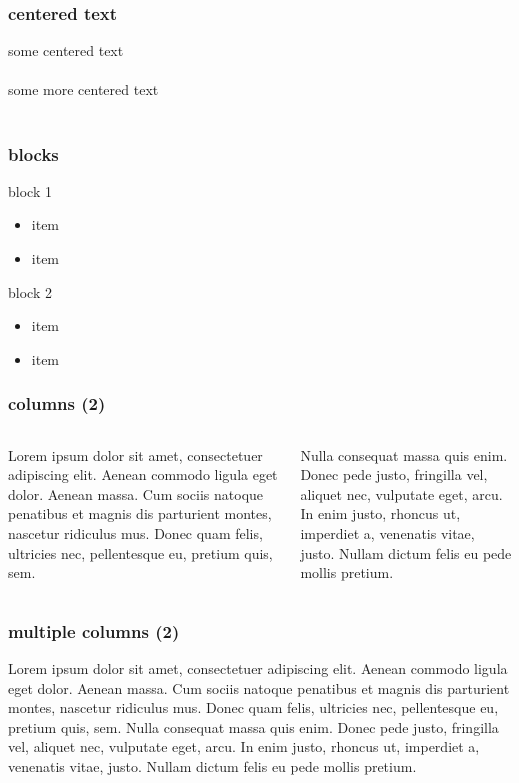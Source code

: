 \begin{frame}
\frametitle{centered text}
\begin{center}
some centered text\\\mbox{}\\some more centered text\\\mbox{}\\
\end{center}
\end{frame}

\begin{frame}
\frametitle{blocks}
\begin{block}{block 1}
\begin{itemize}
\item item
\item item
\end{itemize}
\end{block}
\begin{block}{block 2}
\begin{itemize}
\item item
\item item
\end{itemize}
\end{block}
\end{frame}

\begin{frame}
\frametitle{columns (2)}
\begin{columns}
\begin{column}[t]{.5\textwidth}
\justifying
Lorem ipsum dolor sit amet, consectetuer adipiscing elit. Aenean commodo ligula eget dolor. Aenean massa. Cum sociis natoque penatibus et magnis dis parturient montes, nascetur ridiculus mus. Donec quam felis, ultricies nec, pellentesque eu, pretium quis, sem.
\end{column}
\hfill
\begin{column}[t]{.5\textwidth}
\justifying
Nulla consequat massa quis enim. Donec pede justo, fringilla vel, aliquet nec, vulputate eget, arcu. In enim justo, rhoncus ut, imperdiet a, venenatis vitae, justo. Nullam dictum felis eu pede mollis pretium.
\end{column}%
\end{columns}
\end{frame}

\begin{frame}
\frametitle{multiple columns (2)}
\setlength\columnsep{30pt}
\begin{multicols}{2}
\justifying
Lorem ipsum dolor sit amet, consectetuer adipiscing elit. Aenean commodo ligula eget dolor. Aenean massa. Cum sociis natoque penatibus et magnis dis parturient montes, nascetur ridiculus mus. Donec quam felis, ultricies nec, pellentesque eu, pretium quis, sem. Nulla consequat massa quis enim. Donec pede justo, fringilla vel, aliquet nec, vulputate eget, arcu. In enim justo, rhoncus ut, imperdiet a, venenatis vitae, justo. Nullam dictum felis eu pede mollis pretium.
\end{multicols}
\end{frame}

